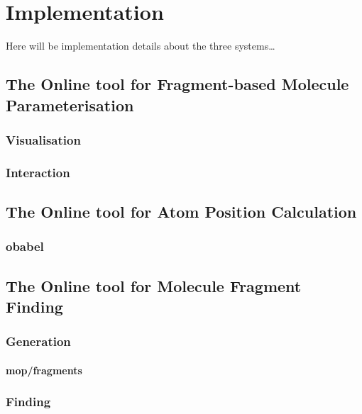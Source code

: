 \chapter{Implementation}

Here will be implementation details about the three systems\ldots

\nlipsum


\section[OFraMP]{The Online tool for Fragment-based Molecule Parameterisation}
\nlipsum

\subsection{Visualisation}
\nlipsum

\subsection{Interaction}
\nlipsum


\section[OAPoC]{The Online tool for Atom Position Calculation}
\nlipsum

\subsection{obabel}
\nlipsum


\section[OMFraF]{The Online tool for Molecule Fragment Finding}
\nlipsum

\subsection{Generation}
\nlipsum

\subsubsection{mop/fragments}
\nlipsum

\subsection{Finding}
\nlipsum
